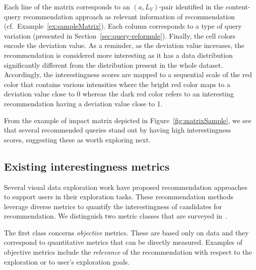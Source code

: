  Each line of the matrix corresponds to an $(a, L_V)$-pair identified in the content-query recommendation approach as relevant information of recommendation (cf.~Example~\ref{ex:sampleMatrix}). Each column corresponds to a type of query variation (presented in Section~\ref{sec:query-reformule}). Finally, the cell colors encode the deviation value.  As a reminder, as the deviation value increases, the recommendation is considered more interesting as it has a data distribution significantly different from the distribution present in the whole dataset. Accordingly, the interestingness scores are mapped to a sequential scale of the red color that contains various intensities where the bright red color maps to a  deviation value close to 0 whereas the dark red color refers to an interesting recommendation having a deviation value close to 1. 



From the example of impact matrix depicted in Figure~\ref{fig:matrixSample}, we see that several recommended queries stand out by having high interestingness scores, suggesting these as worth exploring next.




\subsection{Existing interestingness metrics}
Several visual data exploration work have proposed recommendation approaches to support users in their exploration tasks. These recommendation methods leverage diverse metrics to quantify the interestingness of candidates for recommendation.
We distinguish two metric classes that are surveyed in~\cite{Brijs:2003,Geng:2006}.


The first class concerns \emph{objective} metrics.
These are based only on data and they correspond to quantitative metrics that can be directly measured.
Examples of objective metrics include the \emph{relevance} of the recommendation with respect to the exploration or to user's exploration goals. 

